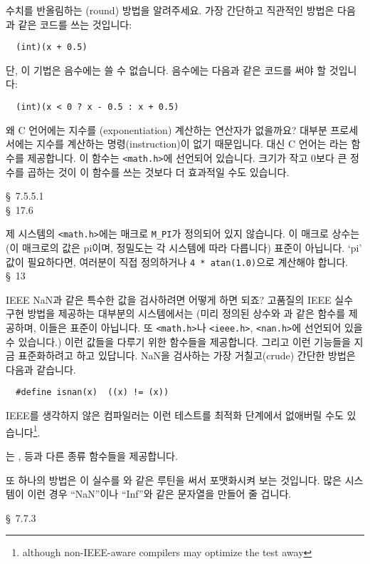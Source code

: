 \begin{faq}
	수치를 반올림하는 (round) 방법을 알려주세요.
\A
	가장 간단하고 직관적인 방법은 다음과 같은 코드를 쓰는 것입니다:
\begin{verbatim}
  (int)(x + 0.5)
\end{verbatim}
	\noindent 단, 이 기법은 음수에는 쓸 수 없습니다.  음수에는
	다음과 같은 코드를 써야 할 것입니다:
\begin{verbatim}
  (int)(x < 0 ? x - 0.5 : x + 0.5)
\end{verbatim}
\end{faq}

\begin{faq}
	왜 C 언어에는 지수를 (exponentiation) 계산하는 연산자가 없을까요?
\A
	대부분 프로세서에는 지수를 계산하는 명령(instruction)이 없기
	때문입니다.  대신 C 언어는 라는 함수를 제공합니다.
	이 함수는 \verb+<math.h>+에 선언되어 있습니다.
	크기가 작고 0보다 큰 정수를 곱하는 것이 이 함수를 쓰는 것보다
	더 효과적일 수도 있습니다.

\R
	\cite{c89} \S\ 7.5.5.1 \\
	\cite{hs} \S\ 17.6 
\end{faq}

\begin{faq}
	제 시스템의 \verb+<math.h>+에는 매크로 \verb+M_PI+가 정의되어
	있지 않습니다.
\A
	이 매크로 상수는 (이 매크로의 값은 pi이며, 정밀도는 각 시스템에
	따라 다릅니다) 표준이 아닙니다.
	`pi' 값이 필요하다면, 여러분이 직접 정의하거나 \verb+4 * atan(1.0)+으로
	계산해야 합니다.
\R
	\cite{pcs} \S\ 13 
\end{faq}

\begin{faq}
	IEEE NaN과 같은 특수한 값을 검사하려면 어떻게 하면 되죠?
\A
	고품질의 IEEE 실수 구현 방법을 제공하는 대부분의 시스템에서는
	(미리 정의된 상수와 과 같은 함수를 제공하며, 이들은
	표준이 아닙니다.  또 \verb+<math.h>+나 \verb+<ieee.h>+, \verb+<nan.h>+에
	선언되어 있을 수 있습니다.) 이런 값들을 다루기 위한 함수들을 제공합니다.
	그리고 이런 기능들을 지금 표준화하려고 하고 있답니다.
	NaN을 검사하는 가장 거칠고(crude) 간단한 방법은 다음과 같습니다.

\begin{verbatim}
  #define isnan(x)	((x) != (x))
\end{verbatim}
	IEEE를 생각하지 않은 컴파일러는 이런 테스트를 최적화 단계에서
	없애버릴 수도 있습니다\footnote{although non-IEEE-aware compilers
	may optimize the test away}.

	\cite{c9x}는 ,  등과 다른 종류 함수들을
	제공합니다.

	또 하나의 방법은 이 실수를 와 같은 루틴을 써서 포맷화시켜
	보는 것입니다.  많은 시스템이 이런 경우 ``NaN''이나 ``Inf''와 같은
	문자열을 만들어 줄 겁니다.

\R
	\cite{c9x} \S\ 7.7.3
\end{faq}


